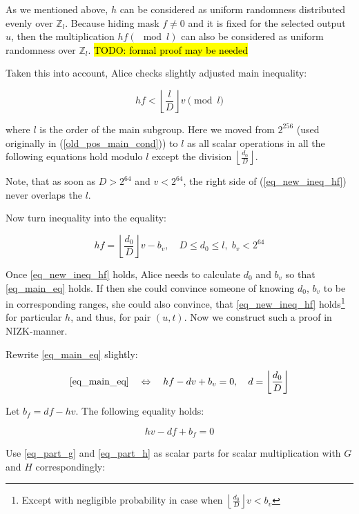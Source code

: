 \documentclass{article}
\newcommand{\floor}[1]{\left\lfloor #1 \right\rfloor}
\numberwithin{figure}{section}
\begin{document}
As we mentioned above, $h$ can be considered as uniform randomness distributed evenly over $\mathbb{Z}_l$. Because hiding mask $f \neq 0$ and it is fixed for the selected output $u$, then the multiplication $hf (\mod{l})$ can also be considered as uniform randomness over $\mathbb{Z}_l$. \hl{TODO: formal proof may be needed}

Taken this into account, Alice checks slightly adjusted main inequality:

\begin{equation} \label{eq_new_ineq_hf}
    hf < \floor{\frac{l}{D}}v \pmod l
\end{equation}

where $l$ is the order of the main subgroup. Here we moved from $2^{256}$ (used originally in (\ref{old_pos_main_cond})) to $l$ as all scalar operations in all the following equations hold modulo $l$ except the division $\floor{\frac{d_0}{D}}$.

Note, that as soon as $D > 2^{64}$ and $v < 2^{64}$, the right side of (\ref{eq_new_ineq_hf}) never overlaps the $l$.

Now turn inequality into the equality:

\begin{equation} \label{eq_main_eq}
    hf = \floor{\frac{d_0}{D}} v - b_v, \quad D \leq d_0 \leq l, \; b_v < 2^{64}
\end{equation}

Once \eqref{eq_new_ineq_hf} holds, Alice needs to calculate $d_0$ and $b_v$ so that \eqref{eq_main_eq} holds. If then she could convince someone of knowing $d_0$, $b_v$ to be in corresponding ranges, she could also convince, that \eqref{eq_new_ineq_hf} holds\footnote{Except with negligible probability in case when $\floor{\frac{d_0}{D}}v < b_v$} for particular $h$, and thus, for pair $(u, t)$. Now we construct such a proof in NIZK-manner.

Rewrite \eqref{eq_main_eq} slightly:

\begin{equation} \label{eq_part_g}
    \eqref{eq_main_eq} \quad \Leftrightarrow \quad hf - dv + b_v = 0, \quad d = \floor{\frac{d_0}{D}}
\end{equation}

Let $b_f = df - hv$. The following equality holds:

\begin{equation} \label{eq_part_h}
    hv - df + b_f = 0
\end{equation}

Use \eqref{eq_part_g} and \eqref{eq_part_h} as scalar parts for scalar multiplication with $G$ and $H$ correspondingly:
\end{document}
